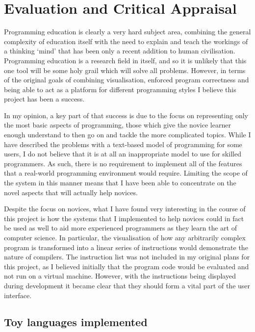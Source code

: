 \chapter{Evaluation and Critical Appraisal}

Programming education is clearly a very hard subject area, combining the general complexity of education itself with the need to explain and teach the workings of a thinking ‘mind’ that has been only a recent addition to human civilisation. Programming education is a research field in itself, and so it is unlikely that this one tool will be some holy grail which will solve all problems. However, in terms of the original goals of combining visualisation, enforced program correctness and being able to act as a platform for different programming styles I believe this project has been a success.

In my opinion, a key part of that success is due to the focus on representing only the most basic aspects of programming, those which give the novice learner enough understand to then go on and tackle the more complicated topics. While I have described the problems with a text-based model of programming for some users, I do not believe that it is at all an inappropriate model to use for skilled programmers. As such, there is no requirement to implement all of the features that a real-world programming environment would require. Limiting the scope of the system in this manner means that I have been able to concentrate on the novel aspects that will actually help novices.

Despite the focus on novices, what I have found very interesting in the course of this project is how the systems that I implemented to help novices could in fact be used as well to aid more experienced programmers as they learn the art of computer science. In particular, the visualisation of how any arbitrarily complex program is transformed into a linear series of instructions would demonstrate the nature of compilers. The instruction list was not included in my original plans for this project, as I believed initially that the program code would be evaluated and not run on a virtual machine. However, with the instructions being displayed during development it became clear that they should form a vital part of the user interface.

\section{Toy languages implemented}


